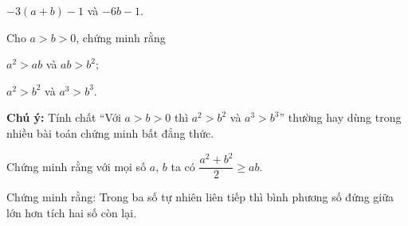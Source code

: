 \begin{practice}
\begin{questions}[resume=SBT]
\begin{questions}
            \answerline
            \item $-3(a+b)-1$ và $-6b-1$.

            \answerline
        \end{questions}

        \item Cho $a>b>0$, chứng minh rằng
        \begin{questions}
            \item $a^2>ab$ và $ab>b^2$;

            \answerline
            \item $a^2>b^2$ và $a^3>b^3$.

            \answerline
        \end{questions}

        \textbf{Chú ý:} Tính chất ``Với $a>b>0$ thì $a^2>b^2$ và $a^3>b^3$'' thường hay dùng trong nhiều bài toán chứng minh bất đẳng thức.

        \item Chứng minh rằng với mọi số $a$, $b$ ta có $\dfrac{a^2+b^2}{2}\ge ab$.

        \answerline
        \answerline

        \item Chứng minh rằng: Trong ba số tự nhiên liên tiếp thì bình phương số đứng giữa lớn hơn tích hai số còn lại.

        \answerline
        \answerline
    \end{questions}
\end{practice}
